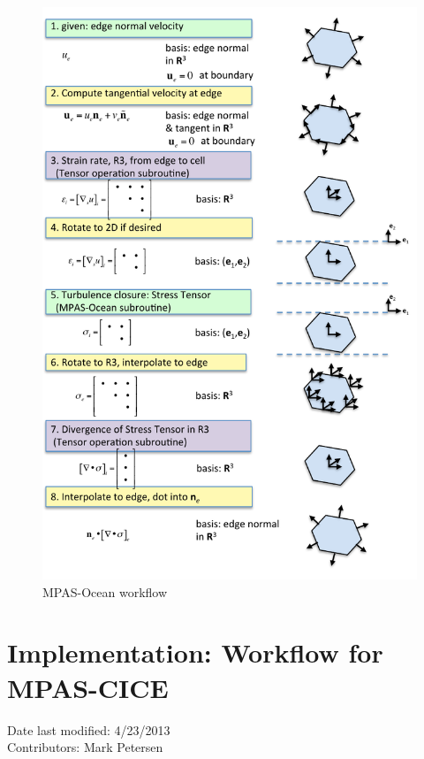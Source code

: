 \documentclass[11pt]{report}
\begin{document}
\begin{figure}[htbp]
 \center
 \includegraphics[scale=0.9]{f/mpaso_tensor_workflow.pdf}
 \caption{MPAS-Ocean workflow}
 \label{fig:mpaso_tensor_workflow}
\end{figure}



\newpage

\section{Implementation: Workflow for MPAS-CICE}
Date last modified: 4/23/2013 \\
Contributors: Mark Petersen \\
\end{document}
